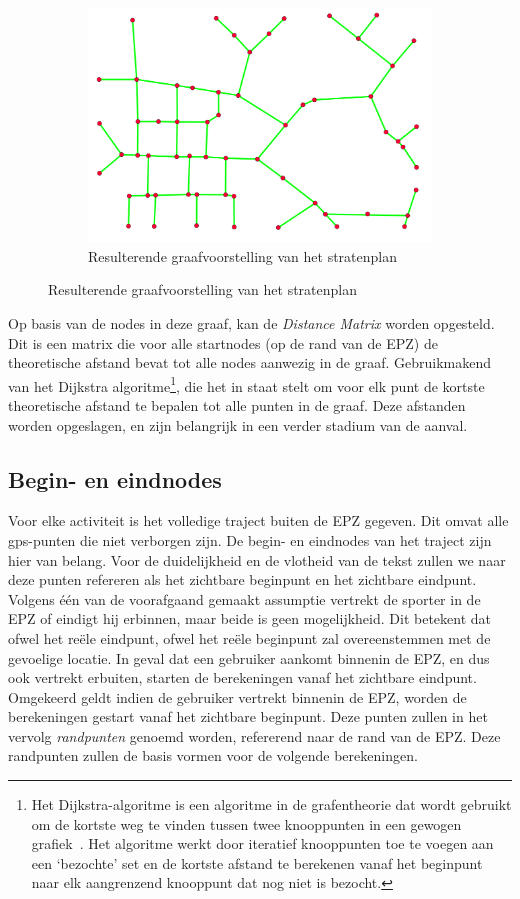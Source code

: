 \begin{figure}[h]
\begin{subfigure}[b]{.4\textwidth}
        \includegraphics[width=1\textwidth]{fig/RoadGraph/Graph.png}
        \caption{Resulterende graafvoorstelling van het stratenplan}
    \end{subfigure}
\end{figure}

Op basis van de nodes in deze graaf, kan de \textit{Distance Matrix} worden
opgesteld. Dit is een matrix die voor alle startnodes (op de rand van de
\ac{EPZ}) de theoretische afstand bevat tot alle nodes aanwezig in de graaf.
Gebruikmakend van het Dijkstra algoritme\footnote{Het Dijkstra-algoritme is een
    algoritme in de grafentheorie dat wordt gebruikt om de kortste weg te vinden
    tussen twee knooppunten in een gewogen grafiek~\cite{dijkstra}. Het algoritme
    werkt door iteratief knooppunten toe te voegen aan een `bezochte' set en de
    kortste afstand te berekenen vanaf het beginpunt naar elk aangrenzend knooppunt
    dat nog niet is bezocht.}, die het in staat stelt om voor elk punt de kortste
theoretische afstand te bepalen tot alle punten in de graaf. Deze afstanden
worden opgeslagen, en zijn belangrijk in een verder stadium van de aanval.

\subsection{Begin- en eindnodes}
Voor elke activiteit is het volledige traject buiten de \ac{EPZ} gegeven. Dit
omvat alle \ac{gps}-punten die niet verborgen zijn. De begin- en eindnodes van
het traject zijn hier van belang. Voor de duidelijkheid en de vlotheid van de
tekst zullen we naar deze punten refereren als het zichtbare beginpunt en het
zichtbare eindpunt. Volgens één van de voorafgaand gemaakt assumptie vertrekt
de sporter in de \ac{EPZ} of eindigt hij erbinnen, maar beide is geen
mogelijkheid. Dit betekent dat ofwel het reële eindpunt, ofwel het reële
beginpunt zal overeenstemmen met de gevoelige locatie. In geval dat een
gebruiker aankomt binnenin de \ac{EPZ}, en dus ook vertrekt erbuiten, starten
de berekeningen vanaf het zichtbare eindpunt. Omgekeerd geldt indien de
gebruiker vertrekt binnenin de \ac{EPZ}, worden de berekeningen gestart vanaf
het zichtbare beginpunt. Deze punten zullen in het vervolg \textit{randpunten}
genoemd worden, refererend naar de rand van de \ac{EPZ}. Deze randpunten zullen
de basis vormen voor de volgende berekeningen.

